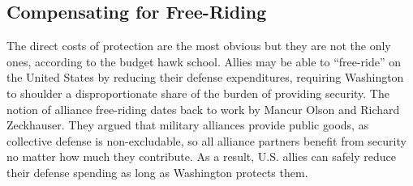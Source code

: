 \subsection*{Compensating for Free-Riding}

The direct costs of protection are the most obvious but they are not the only ones, according to the budget hawk school. Allies may be able to ``free-ride'' on the United States by reducing their defense expenditures, requiring Washington to shoulder a disproportionate share of the burden of providing security. The notion of alliance free-riding dates back to work by Mancur Olson and Richard Zeckhauser.\autocite{OlsonZeckhauser1966} They argued that military alliances provide public goods, as collective defense is non-excludable, so all alliance partners benefit from security no matter how much they contribute. As a result, U.S. allies can safely reduce their defense spending as long as Washington protects them. %

